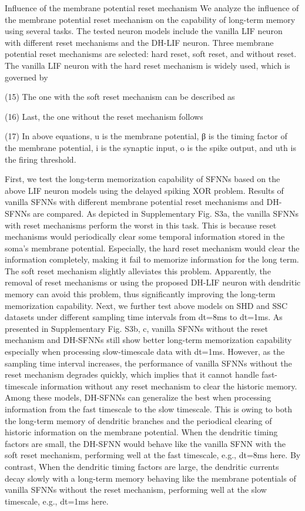 Influence of the membrane potential reset mechanism
We analyze the influence of the membrane potential reset mechanism on the capability of long-term memory using several tasks. The tested neuron models include the vanilla LIF neuron with different reset mechanisms and the DH-LIF neuron. Three membrane potential reset mechanisms are selected: hard reset, soft reset, and without reset. The vanilla LIF neuron with the hard reset mechanism is widely used, which is governed by

(15)
The one with the soft reset mechanism can be described as

(16)
Last, the one without the reset mechanism follows

(17)
In above equations, u is the membrane potential, β is the timing factor of the membrane potential, i is the synaptic input, o is the spike output, and uth is the firing threshold.

First, we test the long-term memorization capability of SFNNs based on the above LIF neuron models using the delayed spiking XOR problem. Results of vanilla SFNNs with different membrane potential reset mechanisms and DH-SFNNs are compared. As depicted in Supplementary Fig. S3a, the vanilla SFNNs with reset mechanisms perform the worst in this task. This is because reset mechanisms would periodically clear some temporal information stored in the soma’s membrane potential. Especially, the hard reset mechanism would clear the information completely, making it fail to memorize information for the long term. The soft reset mechanism slightly alleviates this problem. Apparently, the removal of reset mechanisms or using the proposed DH-LIF neuron with dendritic memory can avoid this problem, thus significantly improving the long-term memorization capability. Next, we further test above models on SHD and SSC datasets under different sampling time intervals from dt=8ms to dt=1ms. As presented in Supplementary Fig. S3b, c, vanilla SFNNs without the reset mechanism and DH-SFNNs still show better long-term memorization capability especially when processing slow-timescale data with dt=1ms. However, as the sampling time interval increases, the performance of vanilla SFNNs without the reset mechanism degrades quickly, which implies that it cannot handle fast-timescale information without any reset mechanism to clear the historic memory. Among these models, DH-SFNNs can generalize the best when processing information from the fast timescale to the slow timescale. This is owing to both the long-term memory of dendritic branches and the periodical clearing of historic information on the membrane potential. When the dendritic timing factors are small, the DH-SFNN would behave like the vanilla SFNN with the soft reset mechanism, performing well at the fast timescale, e.g., dt=8ms here. By contrast, When the dendritic timing factors are large, the dendritic currents decay slowly with a long-term memory behaving like the membrane potentials of vanilla SFNNs without the reset mechanism, performing well at the slow timescale, e.g., dt=1ms here.

